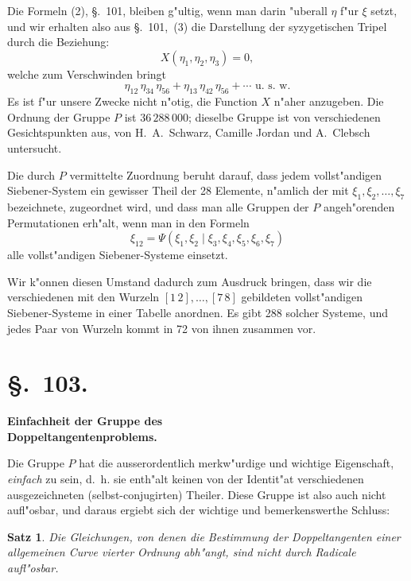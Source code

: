 \documentclass[12pt,a4paper]{article}
\theoremstyle{plain}
\newtheorem{satz}{Satz}[section]
\begin{document}
Die Formeln (2), \S.~101, bleiben g"ultig, wenn man darin "uberall $\eta$ f"ur $\xi$ setzt, und wir erhalten also aus \S.~101,~(3) die Darstellung der syzygetischen Tripel durch die Beziehung:
\begin{equation}
X(\eta_1, \eta_2, \eta_3) = 0,
\end{equation}
welche zum Verschwinden bringt
\[\eta_{12}\,\eta_{34}\,\eta_{56} + \eta_{13}\,\eta_{42}\,\eta_{56} + \cdots \text{ u.~s.~w.}\]
Es ist f"ur unsere Zwecke nicht n"otig, die Function $X$ n"aher anzugeben. Die Ordnung der Gruppe $P$ ist $36\,288\,000$; dieselbe Gruppe ist von verschiedenen Gesichtspunkten aus, von H.~A.~Schwarz, Camille Jordan und A.~Clebsch untersucht.

Die durch $P$ vermittelte Zuordnung beruht darauf, dass jedem vollst"andigen Siebener-System ein gewisser Theil der 28 Elemente, n"amlich der mit $\xi_1,\xi_2,\ldots,\xi_7$ bezeichnete, zugeordnet wird, und dass man alle Gruppen der $P$ angeh"orenden Permutationen erh"alt, wenn man in den Formeln
\[\xi_{12} = \Psi(\xi_1,\xi_2\mid\xi_3,\xi_4,\xi_5,\xi_6,\xi_7)\]
alle vollst"andigen Siebener-Systeme einsetzt.

Wir k"onnen diesen Umstand dadurch zum Ausdruck bringen, dass wir die verschiedenen mit den Wurzeln $[1\,2],\ldots,[7\,8]$ gebildeten vollst"andigen Siebener-Systeme in einer Tabelle anordnen. Es gibt 288 solcher Systeme, und jedes Paar von Wurzeln kommt in 72 von ihnen zusammen vor.

\section*{\S.~103.}
\begin{center}
\large\bfseries Einfachheit der Gruppe des\\ Doppeltangentenproblems.
\end{center}
\vspace{0.5em}

Die Gruppe $P$ hat die ausserordentlich merkw"urdige und wichtige Eigenschaft, \emph{einfach} zu sein, d.~h. sie enth"alt keinen von der Identit"at verschiedenen ausgezeichneten (selbst-conjugirten) Theiler. Diese Gruppe ist also auch nicht aufl"osbar, und daraus ergiebt sich der wichtige und bemerkenswerthe Schluss:

\begin{satz}
Die Gleichungen, von denen die Bestimmung der Doppeltangenten einer allgemeinen Curve vierter Ordnung abh"angt, sind nicht durch Radicale aufl"osbar.
\end{satz}
\end{document}
